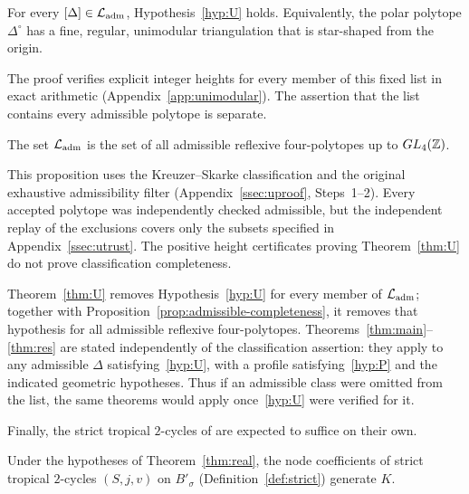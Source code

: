 \begin{mainthm}\label{thm:U}
For every $[\Delta]\in\mathcal L_{\rm adm}$, Hypothesis~\ref{hyp:U} holds. Equivalently, the polar polytope
$\Delta^\circ$ has a fine, regular, unimodular triangulation that is star-shaped from the origin.
\end{mainthm}

The proof verifies explicit integer heights for every member of this fixed list in exact arithmetic
(Appendix~\ref{app:unimodular}). The assertion that the list contains every admissible polytope is separate.

\begin{proposition}\label{prop:admissible-completeness}
The set $\mathcal L_{\rm adm}$ is the set of all admissible reflexive four-polytopes up to $GL_4(\mathbb Z)$.
\end{proposition}

This proposition uses the Kreuzer--Skarke classification and the original exhaustive admissibility filter
(Appendix~\ref{ssec:uproof}, Steps~1--2). Every accepted polytope was independently checked admissible, but the
independent replay of the exclusions covers only the subsets specified in Appendix~\ref{ssec:utrust}.
The positive height certificates proving Theorem~\ref{thm:U} do not prove classification completeness.

Theorem~\ref{thm:U} removes Hypothesis~\ref{hyp:U} for every member of $\mathcal L_{\rm adm}$; together with
Proposition~\ref{prop:admissible-completeness}, it removes that hypothesis for all admissible reflexive four-polytopes.
Theorems~\ref{thm:main}--\ref{thm:res} are stated independently of the classification assertion: they apply to any
admissible $\Delta$ satisfying~\ref{hyp:U}, with a profile satisfying~\ref{hyp:P} and the indicated geometric hypotheses.
Thus if an admissible class were omitted from the list, the same theorems would apply once~\ref{hyp:U} were verified
for it.

Finally, the strict tropical $2$-cycles of \cite{CBM} are expected to suffice on their own.

\begin{mainconj}\label{conj:strict}
Under the hypotheses of Theorem~\ref{thm:real}, the node coefficients of strict tropical $2$-cycles $(S,j,v)$ on
$B'_\sigma$ (Definition~\ref{def:strict}) generate $K$.
\end{mainconj}

